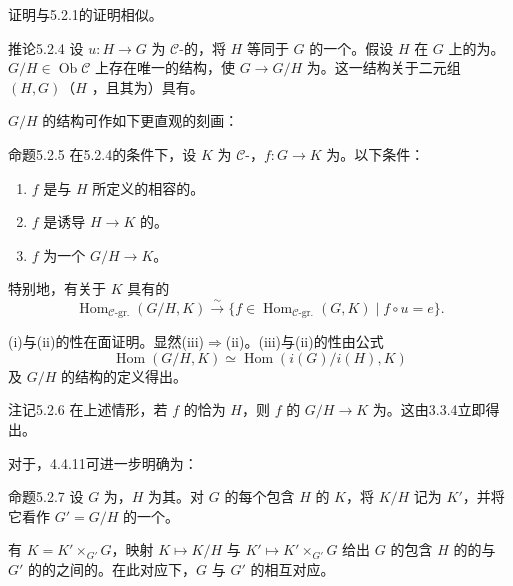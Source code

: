 证明与5.2.1的证明相似。
\begin{SGAresult}{推论}{5.2.4}
设 $u:H\to G$ 为 $\mathcal C$-的，将 $H$ 等同于 $G$ 的一个。假设 $H$ 在 $G$ 上的为。 $G/H\in\operatorname{Ob}\mathcal C$ 上存在唯一的结构，使 $G\to G/H$ 为。这一结构关于二元组 $(H,G)$（$H$ ，且其为）具有。
\end{SGAresult}
$G/H$ 的结构可作如下更直观的刻画：
\begin{SGAresult}{命题}{5.2.5}
在5.2.4的条件下，设 $K$ 为 $\mathcal C$-，$f:G\to K$ 为。以下条件：
\begin{enumerate}
\item[(i)] $f$ 是与 $H$ 所定义的相容的。
\item[(ii)] $f$ 是诱导 $H\to K$ 的。
\item[(iii)] $f$ 为一个 $G/H\to K$。
\end{enumerate}
特别地，有关于 $K$ 具有的
\[
\operatorname{Hom}_{\mathcal C\text{-gr.}}(G/H,K)\xrightarrow{\sim}
\{f\in\operatorname{Hom}_{\mathcal C\text{-gr.}}(G,K)\mid f\circ u=e\}.
\]
\end{SGAresult}
(i)与(ii)的性在面证明。显然(iii)$\Rightarrow$(ii)。(iii)与(ii)的性由公式
\[
\operatorname{Hom}(G/H,K)\simeq\operatorname{Hom}(i(G)/i(H),K)
\]
及 $G/H$ 的结构的定义得出。
\begin{SGAresult}{注记}{5.2.6}
在上述情形，若 $f$ 的恰为 $H$，则 $f$ 的 $G/H\to K$ 为。这由3.3.4立即得出。
\end{SGAresult}
对于，4.4.11可进一步明确为：
\begin{SGAresult}{命题}{5.2.7}
设 $G$ 为，$H$ 为其。对 $G$ 的每个包含 $H$ 的 $K$，将 $K/H$ 记为 $K'$，并将它看作 $G'=G/H$ 的一个。

有 $K=K'\times_{G'}G$，映射 $K\mapsto K/H$ 与 $K'\mapsto K'\times_{G'}G$ 给出 $G$ 的包含 $H$ 的的与 $G'$ 的的之间的。在此对应下，$G$ 与 $G'$ 的相互对应。
\end{SGAresult}
